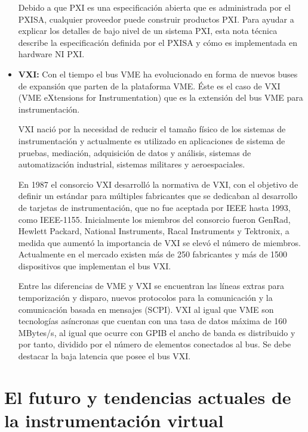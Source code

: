 \documentclass[12pt,letterpaper, onecolumn, titlepage, oneside]{book}
\begin{document}
\begin{itemize}
    Debido a que PXI es una especificación abierta que es administrada por el PXISA, cualquier proveedor puede construir productos PXI. Para ayudar a explicar los detalles de bajo nivel de un sistema PXI, esta nota técnica describe la especificación definida por el PXISA y cómo es implementada en hardware NI PXI.
    
    \item \textbf{VXI:} Con el tiempo el bus VME ha evolucionado en forma de nuevos buses de expansión que parten de la plataforma VME. Éste es el caso de VXI (VME eXtensions for Instrumentation) que es la extensión del bus VME para instrumentación. 
    
    
    VXI nació por la necesidad de reducir el tamaño físico de los sistemas de instrumentación y actualmente es utilizado en aplicaciones de sistema de pruebas, mediación, adquisición de datos y análisis, sistemas de automatización industrial, sistemas militares y aeroespaciales. 
    
    
    En 1987 el consorcio VXI desarrolló la normativa de VXI, con el objetivo de definir un estándar para múltiples fabricantes que se dedicaban al desarrollo de tarjetas de instrumentación, que no fue aceptada por IEEE hasta 1993, como IEEE-1155. Inicialmente los miembros del consorcio fueron GenRad, Hewlett Packard, National Instruments, Racal Instruments y Tektronix, a medida que aumentó la importancia de VXI se elevó el número de miembros. Actualmente en el mercado existen más de 250 fabricantes y más de 1500 dispositivos que implementan el bus VXI. 
    
    Entre las diferencias de VME y VXI se encuentran las líneas extras para temporización y disparo, nuevos protocolos para la comunicación y la comunicación basada en mensajes (SCPI). VXI al igual que VME son tecnologías asíncronas que cuentan con una tasa de datos máxima de 160 MBytes/s, al igual que ocurre con GPIB el ancho de banda es distribuido y por tanto, dividido por el número de elementos conectados al bus. Se debe destacar la baja latencia que posee el bus VXI.


    
    
    
\end{itemize}


\section{El futuro y tendencias actuales de la instrumentación virtual}
\end{document}
